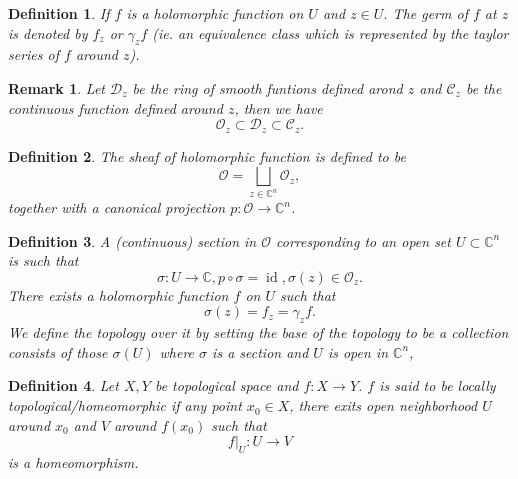 \documentclass{article}
\newtheorem{definition}{Definition}[section]
\newtheorem{remark}{Remark}[section]
\DeclareMathOperator{\id}{id}
\newcommand{\C}[0]{\mathbb{C}}
\begin{document}
\begin{definition}
  If $f$ is a holomorphic function on $U$ and $z\in U$. The germ of $f$ at $z$ is denoted by $f_z$ or $\gamma_z f$ (ie. an equivalence class which is represented by the taylor series of $f$ around $z$).
\end{definition}

\begin{remark}
  Let $\mathcal{D}_z$ be the ring of smooth funtions defined arond $z$ and $\mathcal{C}_z$ be the continuous function defined around $z$, then we have 
  \begin{equation*}
    \mathcal{O}_z\subset\mathcal{D}_z\subset\mathcal{C}_z.
  \end{equation*}
\end{remark}

\begin{definition}
  The sheaf of holomorphic function is defined to be 
  \begin{equation*}
    \mathcal{O} = \bigsqcup_{z\in\C^n}\mathcal{O}_z,
  \end{equation*}
  together with a canonical projection $p:\mathcal{O}\to \C^n$.
\end{definition}

\begin{definition}
  A (continuous) section in $\mathcal{O}$ corresponding to an open set $U\subset \C^n$ is such that 
  \begin{equation*}
    \sigma:U\to\C ,p\circ\sigma = \id,\sigma(z)\in\mathcal{O}_z.
  \end{equation*}
  There exists a holomorphic function $f$ on $U$ such that 
  \begin{equation*}
    \sigma(z) = f_z = \gamma_zf.
  \end{equation*}
  We define the topology over it by setting the base of the topology to be a collection consists of those $\sigma(U)$ where $\sigma$ is a section and $U$ is open in $\C^n$, 
\end{definition}

\begin{definition}
  Let $X,Y$ be topological space and $f:X\to Y$. $f$ is said to be locally topological/homeomorphic if any point $x_0\in X$, there exits open neighborhood $U$ around $x_0$ and $V$ around $f(x_0)$ such that 
  \begin{equation*}
    f|_U:U\to V
  \end{equation*}
  is a homeomorphism.
\end{definition}
\end{document}
